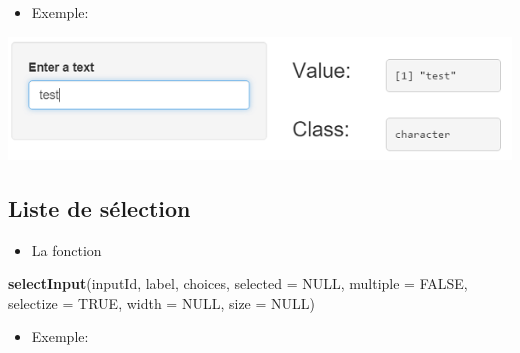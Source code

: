 \documentclass[
]{article}
\newenvironment{Shaded}{\begin{snugshade}}{\end{snugshade}}
\newcommand{\AttributeTok}[1]{\textcolor[rgb]{0.13,0.29,0.53}{#1}}
\newcommand{\CommentTok}[1]{\textcolor[rgb]{0.56,0.35,0.01}{\textit{#1}}}
\newcommand{\ConstantTok}[1]{\textcolor[rgb]{0.56,0.35,0.01}{#1}}
\newcommand{\FunctionTok}[1]{\textcolor[rgb]{0.13,0.29,0.53}{\textbf{#1}}}
\newcommand{\NormalTok}[1]{#1}
\newcommand{\StringTok}[1]{\textcolor[rgb]{0.31,0.60,0.02}{#1}}
\providecommand{\tightlist}{%
  \setlength{\itemsep}{0pt}\setlength{\parskip}{0pt}}
\begin{document}
\begin{itemize}
\tightlist
\item
  Exemple:
\end{itemize}

\begin{Shaded}
\end{Shaded}

\includegraphics{img/text.png}

\hypertarget{liste-de-suxe9lection}{%
\subsection{Liste de sélection}\label{liste-de-suxe9lection}}

\begin{itemize}
\tightlist
\item
  La fonction
\end{itemize}

\begin{Shaded}
\begin{Highlighting}[]
\FunctionTok{selectInput}\NormalTok{(inputId, label, choices, }\AttributeTok{selected =} \ConstantTok{NULL}\NormalTok{, }\AttributeTok{multiple =} \ConstantTok{FALSE}\NormalTok{,}
            \AttributeTok{selectize =} \ConstantTok{TRUE}\NormalTok{, }\AttributeTok{width =} \ConstantTok{NULL}\NormalTok{, }\AttributeTok{size =} \ConstantTok{NULL}\NormalTok{)}
\end{Highlighting}
\end{Shaded}

\begin{itemize}
\tightlist
\item
  Exemple:
\end{itemize}
\end{document}
